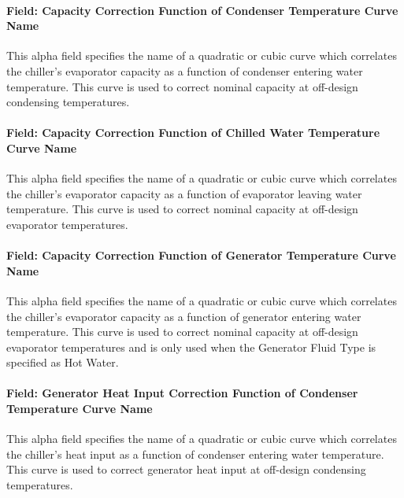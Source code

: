\paragraph{Field: Capacity Correction Function of Condenser Temperature Curve Name}\label{field-capacity-correction-function-of-condenser-temperature-curve-name}

This alpha field specifies the name of a quadratic or cubic curve which correlates the chiller's evaporator capacity as a function of condenser entering water temperature. This curve is used to correct nominal capacity at off-design condensing temperatures.

\paragraph{Field: Capacity Correction Function of Chilled Water Temperature Curve Name}\label{field-capacity-correction-function-of-chilled-water-temperature-curve-name}

This alpha field specifies the name of a quadratic or cubic curve which correlates the chiller's evaporator capacity as a function of evaporator leaving water temperature. This curve is used to correct nominal capacity at off-design evaporator temperatures.

\paragraph{Field: Capacity Correction Function of Generator Temperature Curve Name}\label{field-capacity-correction-function-of-generator-temperature-curve-name}

This alpha field specifies the name of a quadratic or cubic curve which correlates the chiller's evaporator capacity as a function of generator entering water temperature. This curve is used to correct nominal capacity at off-design evaporator temperatures and is only used when the Generator Fluid Type is specified as Hot Water.

\paragraph{Field: Generator Heat Input Correction Function of Condenser Temperature Curve Name}\label{field-generator-heat-input-correction-function-of-condenser-temperature-curve-name}

This alpha field specifies the name of a quadratic or cubic curve which correlates the chiller's heat input as a function of condenser entering water temperature. This curve is used to correct generator heat input at off-design condensing temperatures.

